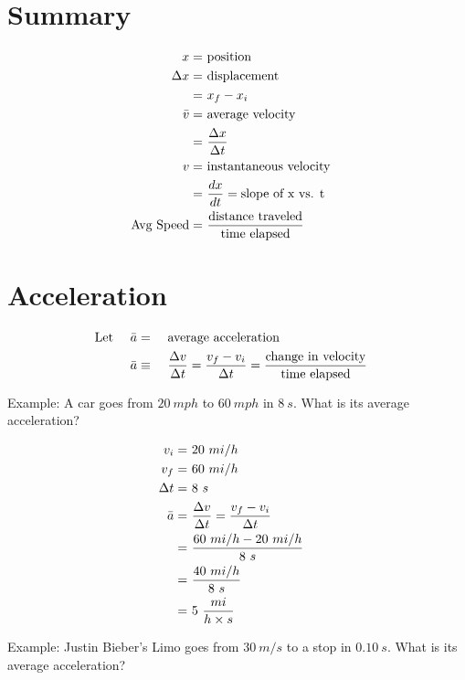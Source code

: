 \section{Summary}
	\begin{align}
		x = \ &\text{position}& \notag \\
		\Delta x = \ &\text{displacement}& \notag \\
		= \ &x_{f} - x_{i}& \notag \\
		\bar{v} = \ &\text{average velocity}& \notag \\
		= \ &\frac{\Delta x}{\Delta t}& \notag \\
		v = \ &\text{instantaneous velocity}& \notag \\
		= \ &\frac{dx}{dt} = \text{slope of x vs. t}& \notag \\
		\text{Avg Speed} = \ &\frac{\text{distance traveled}}{\text{time elapsed}}& \notag
	\end{align}

\section{Acceleration}

	\begin{align}
		&\text{Let} \ & &\bar{a} = \ & &\text{average acceleration}& \notag \\
		&& &\bar{a} \equiv \ & &\frac{\Delta v}{\Delta t} = \frac{v_{f} - v_{i}}{\Delta t} = \frac{\text{change in velocity}}{\text{time elapsed}}& \notag
	\end{align}

	Example: A car goes from $20 \ mph$ to $60 \ mph$ in $8 \ s$. What is its average acceleration?

	\begin{align}
		v_{i} = \ &20 \ mi/h& \notag \\
		v_{f} = \ &60 \ mi/h& \notag \\
		\Delta t = \ &8 \ s& \notag \\
		\bar{a} = \ &\frac{\Delta v}{\Delta t} = \frac{v_{f} - v_{i}}{\Delta t}& \notag \\
		= \ &\frac{60 \ mi/h - 20 \ mi/h}{8 \ s}& \notag \\
		= \ &\frac{40 \ mi/h}{8 \ s}& \notag \\
		= \ &5 \ \frac{mi}{h \times s}& \notag
	\end{align}

	Example: Justin Bieber's Limo goes from $30 \ m/s$ to a stop in $0.10 \ s$. What is its average acceleration?


